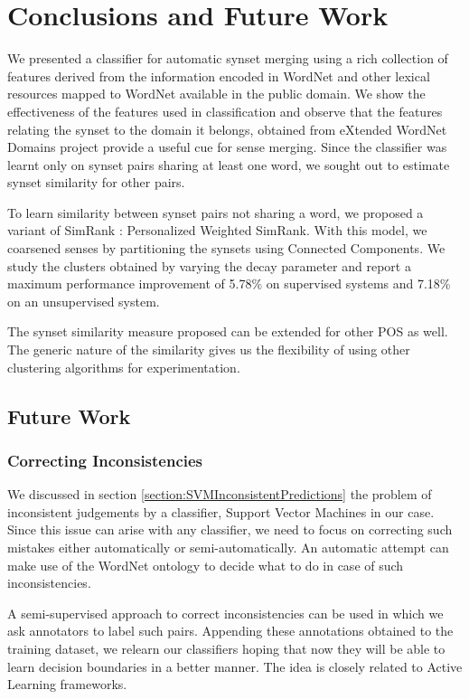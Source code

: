 \chapter{Conclusions and Future Work}
\label{chapter:conclusion}

We presented a classifier for automatic synset merging using a rich collection of features derived from the information encoded in WordNet and other lexical resources mapped to WordNet available in the public domain. We show the effectiveness of the features used in classification and observe that the features relating the synset to the domain it belongs, obtained from eXtended WordNet Domains project \citep{Gonzalez:XWND} provide a useful cue for sense merging. Since the classifier was learnt only on synset pairs sharing at least one word, we sought out to estimate synset similarity for other pairs.

To learn similarity between synset pairs not sharing a word, we proposed a variant of SimRank \citep{Jeh02simrank}: Personalized Weighted SimRank. With this model, we coarsened senses by partitioning the synsets using Connected Components. We study the clusters obtained by varying the decay parameter and report a maximum performance improvement of 5.78\% on supervised systems and 7.18\% on an unsupervised system.

The synset similarity measure proposed can be extended for other POS as well. The generic nature of the similarity gives us the flexibility of using other clustering algorithms for experimentation.

\section{Future Work}
\subsection{Correcting Inconsistencies}
We discussed in section \ref{section:SVMInconsistentPredictions} the problem of inconsistent judgements by a classifier, Support Vector Machines in our case. Since this issue can arise with any classifier, we need to focus on correcting such mistakes either automatically or semi-automatically. An automatic attempt can make use of the WordNet ontology to decide what to do in case of such inconsistencies.

A semi-supervised approach to correct inconsistencies can be used in which we ask annotators to label such pairs. Appending these annotations obtained to the training dataset, we relearn our classifiers hoping that now they will be able to learn decision boundaries in a better manner. The idea is closely related to Active Learning frameworks.

